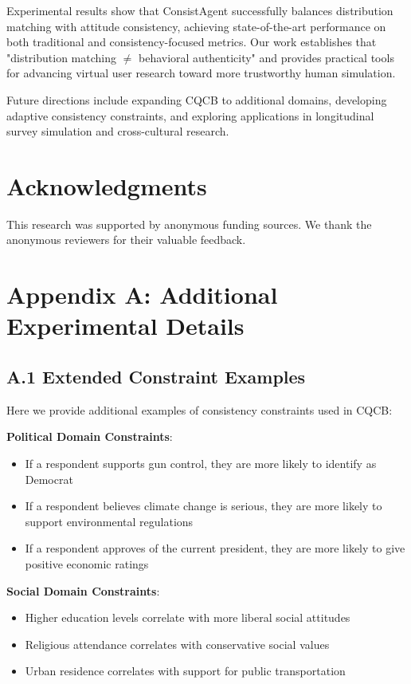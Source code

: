 \documentclass[sigconf, anonymous]{acmart}
\begin{document}
Experimental results show that ConsistAgent successfully balances distribution matching with attitude consistency, achieving state-of-the-art performance on both traditional and consistency-focused metrics. Our work establishes that "distribution matching $\neq$ behavioral authenticity" and provides practical tools for advancing virtual user research toward more trustworthy human simulation.

Future directions include expanding CQCB to additional domains, developing adaptive consistency constraints, and exploring applications in longitudinal survey simulation and cross-cultural research.

\section*{Acknowledgments}

This research was supported by anonymous funding sources. We thank the anonymous reviewers for their valuable feedback.




\newpage
\section*{Appendix A: Additional Experimental Details}

\subsection*{A.1 Extended Constraint Examples}

Here we provide additional examples of consistency constraints used in CQCB:

\textbf{Political Domain Constraints}:
\begin{itemize}
    \item If a respondent supports gun control, they are more likely to identify as Democrat
    \item If a respondent believes climate change is serious, they are more likely to support environmental regulations
    \item If a respondent approves of the current president, they are more likely to give positive economic ratings
\end{itemize}

\textbf{Social Domain Constraints}:
\begin{itemize}
    \item Higher education levels correlate with more liberal social attitudes
    \item Religious attendance correlates with conservative social values
    \item Urban residence correlates with support for public transportation
\end{itemize}
\end{document}
